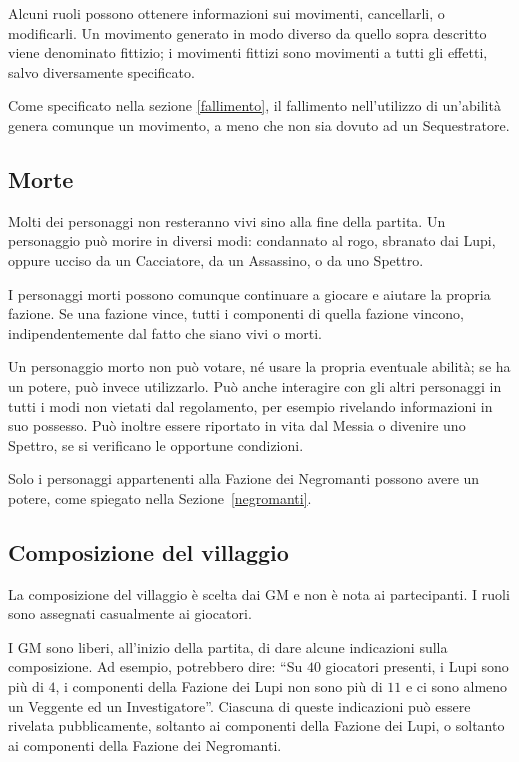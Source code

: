 \documentclass[a4paper,10pt]{article}
\begin{document}
Alcuni ruoli possono ottenere informazioni sui movimenti, cancellarli, o modificarli. Un movimento generato in modo diverso da quello sopra descritto viene denominato fittizio; i movimenti fittizi sono movimenti a tutti gli effetti, salvo diversamente specificato.

Come specificato nella sezione \ref{fallimento}, il fallimento nell'utilizzo di un'abilità genera comunque un movimento, a meno che non sia dovuto ad un Sequestratore.

\subsection{Morte}

Molti dei personaggi non resteranno vivi sino alla fine della partita. Un personaggio può morire in diversi modi: condannato al rogo, sbranato dai Lupi, oppure ucciso da un Cacciatore, da un Assassino, o da uno Spettro.

I personaggi morti possono comunque continuare a giocare e aiutare la propria fazione. Se una fazione vince, tutti i componenti di quella fazione vincono, indipendentemente dal fatto che siano vivi o morti.

Un personaggio morto non può votare, né usare la propria eventuale abilità; se ha un potere, può invece utilizzarlo. Può anche interagire con gli altri personaggi in tutti i modi non vietati dal regolamento, per esempio rivelando informazioni in suo possesso. Può inoltre essere riportato in vita dal Messia o divenire uno Spettro, se si verificano le opportune condizioni.

Solo i personaggi appartenenti alla Fazione dei Negromanti possono avere un potere, come spiegato nella Sezione~\ref{negromanti}.

\subsection{Composizione del villaggio}
 
La composizione del villaggio è scelta dai GM e non è nota ai partecipanti. I ruoli sono assegnati casualmente ai giocatori.

I GM sono liberi, all'inizio della partita, di dare alcune indicazioni sulla composizione. Ad esempio, potrebbero dire: ``Su $40$ giocatori presenti, i Lupi sono più di $4$, i componenti della Fazione dei Lupi non sono più di $11$ e ci sono almeno un Veggente ed un Investigatore''. Ciascuna di queste indicazioni può essere rivelata pubblicamente, soltanto ai componenti della Fazione dei Lupi, o soltanto ai componenti della Fazione dei Negromanti.
\end{document}
